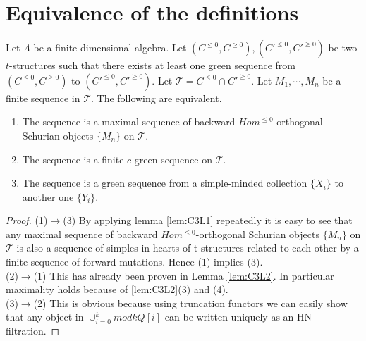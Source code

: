 \section{Equivalence of the definitions}
\begin{theorem}\label{C3TB}
\indent Let $\Lambda$ be a finite dimensional algebra. Let $(C^{\leq 0}, C^{\geq 0}), (C'^{\leq 0}, C'^{\geq 0})$ be two $t$-structures such that there exists at least one green sequence from $(C^{\leq 0}, C^{\geq 0})$ to $(C'^{\leq 0}, C'^{\geq 0})$. Let $\mathcal{T} = C^{\leq 0}\cap C'^{\geq 0}$.  Let $M_1,\cdots, M_n$ be a finite sequence in $\mathcal{T}$. The following are equivalent.
\begin{enumerate}
\item The sequence is a maximal sequence of backward $Hom^{\leq 0}$-orthogonal Schurian objects $\{M_n\}$ on $\mathcal{T}$.
\item The sequence is a finite $c$-green sequence on $\mathcal{T}$.
\item The sequence is a green sequence from a simple-minded collection $\{X_i\}$ to another one $\{Y_i\}$.
\end{enumerate}
\end{theorem}
\begin{proof}
(1)$\to$(3) By applying lemma \ref{lem:C3L1} repeatedly it is easy to see that any maximal sequence of backward $Hom^{\leq 0}$-orthogonal Schurian objects $\{M_n\}$ on $\mathcal{T}$ is also a sequence of simples in hearts of t-structures related to each other by a finite sequence of forward mutations. Hence (1) implies (3).\\
(2)$\to$(1) This has already been proven in Lemma \ref{lem:C3L2}. In particular maximality holds because of \ref{lem:C3L2}(3) and (4).\\
(3)$\to$(2) This is obvious because using truncation functors we can easily show that any object in $\cup_{i=0}^k mod kQ[i]$ can be written uniquely as an HN filtration. 
\end{proof}